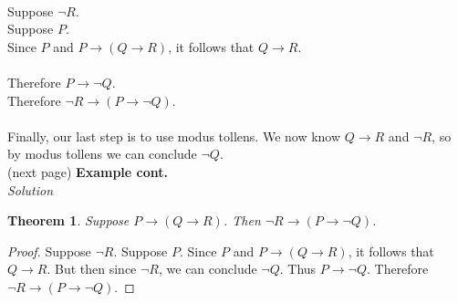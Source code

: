 \documentclass{report}
\newtheorem*{theorem}{Theorem}
\begin{document}
\vspace{1mm}\\
\indent Suppose $\neg R$.\\
\indent\indent Suppose $P$.\\
\indent\indent\indent Since $P$ and $P\to(Q\to R)$, it follows that $Q\to R$.\\
\indent\indent{}\\
\indent\indent Therefore $P\to\neg Q$.\\
\indent Therefore $\neg R\to(P\to\neg Q)$.\\
\vspace{1mm}\\
Finally, our last step is to use modus tollens. We now know $Q\to R$ and $\neg R$, so by modus tollens we can conclude $\neg Q$.\\
(next page)\newpage
\noindent\textbf{Example cont.}\\
\textit{Solution}
\begin{theorem}
Suppose $P\to(Q\to R)$. Then $\neg R\to(P\to\neg Q)$.
\end{theorem}
\begin{proof}
Suppose $\neg R$. Suppose $P$. Since $P$ and $P\to(Q\to R)$, it follows that $Q\to R$. But then since $\neg R$, we can conclude $\neg Q$. Thus
$P\to\neg Q$. Therefore $\neg R\to(P\to\neg Q)$.
\end{proof}
\end{document}
